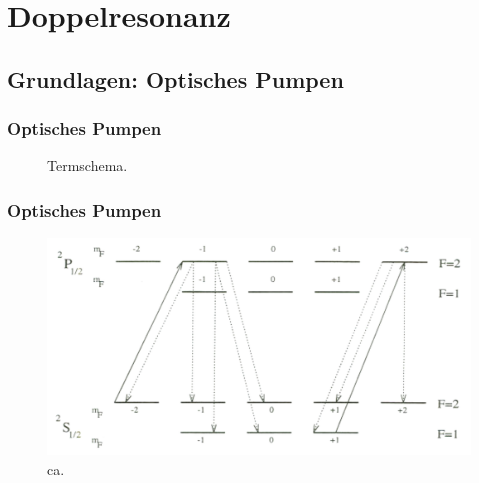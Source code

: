 
\section{Doppelresonanz}
\subsection{Grundlagen: Optisches Pumpen}


\begin{frame}
\frametitle{Optisches Pumpen}

  \begin{figure}
    \centering
    \def\svgwidth{0.45\textwidth}
    
    \caption{Termschema.}
\end{figure}
\end{frame}




\begin{frame}
\frametitle{Optisches Pumpen}

\begin{figure}[H]
\begin{center}
  \includegraphics[width=\textwidth]{../img/optPumpen.png}
  \caption{ca.}
\end{center}
\end{figure}

\end{frame}


